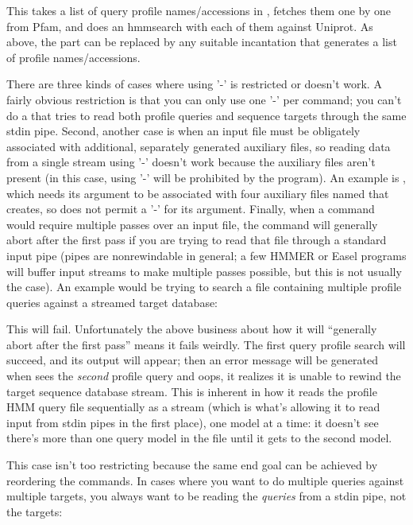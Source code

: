 This takes a list of query profile names/accessions in
, fetches them one by one from Pfam, and does an
hmmsearch with each of them against Uniprot. As above, the  part can be replaced by any suitable incantation
that generates a list of profile names/accessions.

There are three kinds of cases where using '-' is restricted or
doesn't work. A fairly obvious restriction is that you can only use
one '-' per command; you can't do a  that tries to
read both profile queries and sequence targets through the same stdin
pipe. Second, another case is when an input file must be obligately
associated with additional, separately generated auxiliary files, so
reading data from a single stream using '-' doesn't work because the
auxiliary files aren't present (in this case, using '-' will be
prohibited by the program). An example is , which needs
its  argument to be associated with four auxiliary
files named  that  creates,
so  does not permit a '-' for its 
argument. Finally, when a command would require multiple passes over
an input file, the command will generally abort after the first pass
if you are trying to read that file through a standard input pipe
(pipes are nonrewindable in general; a few HMMER or Easel programs
will buffer input streams to make multiple passes possible, but this
is not usually the case). An example would be trying to search a file
containing multiple profile queries against a streamed target
database:


This will fail. Unfortunately the above business about how it will
``generally abort after the first pass'' means it fails weirdly. The
first query profile search will succeed, and its output will appear;
then an error message will be generated when  sees the
\emph{second} profile query and oops, it realizes it is unable to
rewind the target sequence database stream. This is inherent in how it
reads the profile HMM query file sequentially as a stream (which is
what's allowing it to read input from stdin pipes in the first place),
one model at a time: it doesn't see there's more than one query model
in the file until it gets to the second model.

This case isn't too restricting because the same end goal can be
achieved by reordering the commands. In cases where you want to do
multiple queries against multiple targets, you always want to be
reading the \emph{queries} from a stdin pipe, not the targets:

